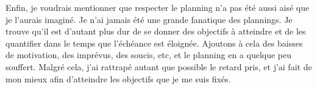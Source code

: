 Enfin, je voudrais mentionner que respecter le planning n'a pas été aussi aisé que je l'aurais imaginé. Je n'ai jamais été une grande fanatique des plannings. Je trouve qu'il est d'autant plus dur de se donner des objectifs à atteindre et de les quantifier dans le temps que l'échéance est éloignée. Ajoutons à cela des baisses de motivation, des imprévus, des soucis, etc, et le planning en a quelque peu souffert. Malgré cela, j'ai rattrapé autant que possible le retard pris, et j'ai fait de mon mieux afin d'atteindre les objectifs que je me suis fixés.


